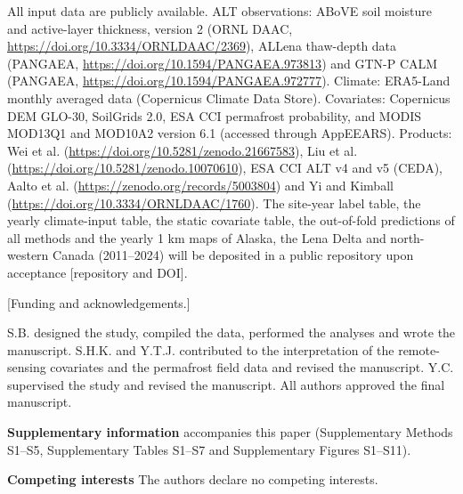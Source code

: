 \ifnum{}
All input data are publicly available. ALT observations: ABoVE soil moisture and active-layer thickness, version 2 (ORNL DAAC, \url{https://doi.org/10.3334/ORNLDAAC/2369}), ALLena thaw-depth data (PANGAEA, \url{https://doi.org/10.1594/PANGAEA.973813}) and GTN-P CALM (PANGAEA, \url{https://doi.org/10.1594/PANGAEA.972777}). Climate: ERA5-Land monthly averaged data (Copernicus Climate Data Store). Covariates: Copernicus DEM GLO-30, SoilGrids 2.0, ESA CCI permafrost probability, and MODIS MOD13Q1 and MOD10A2 version 6.1 (accessed through AppEEARS). Products: Wei et al. (\url{https://doi.org/10.5281/zenodo.21667583}), Liu et al. (\url{https://doi.org/10.5281/zenodo.10070610}), ESA CCI ALT v4 and v5 (CEDA), Aalto et al. (\url{https://zenodo.org/records/5003804}) and Yi and Kimball (\url{https://doi.org/10.3334/ORNLDAAC/1760}). The site-year label table, the yearly climate-input table, the static covariate table, the out-of-fold predictions of all methods and the yearly 1 km maps of Alaska, the Lena Delta and north-western Canada (2011--2024) will be deposited in a public repository upon acceptance [repository and DOI].
\fi

\ifnum{}
[Funding and acknowledgements.]

S.B. designed the study, compiled the data, performed the analyses and wrote the manuscript. S.H.K. and Y.T.J. contributed to the interpretation of the remote-sensing covariates and the permafrost field data and revised the manuscript. Y.C. supervised the study and revised the manuscript. All authors approved the final manuscript.

\textbf{Supplementary information} accompanies this paper (Supplementary Methods S1--S5, Supplementary Tables S1--S7 and Supplementary Figures S1--S11).

\textbf{Competing interests} The authors declare no competing interests.
\fi
